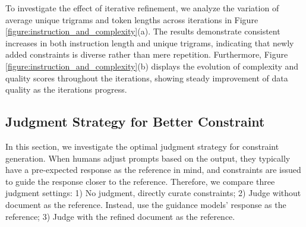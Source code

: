 To investigate the effect of iterative refinement, we analyze the variation of average unique trigrams and token lengths across iterations in Figure \ref{figure:instruction_and_complexity}(a). The results demonstrate consistent increases in both instruction length and unique trigrams, indicating that newly added constraints is diverse rather than mere repetition. Furthermore, Figure \ref{figure:instruction_and_complexity}(b) displays the evolution of complexity and quality scores throughout the iterations, showing steady improvement of data quality as the iterations progress.




\subsection{Judgment Strategy for Better Constraint}
\label{sec:judge}


In this section, we investigate the optimal judgment strategy for constraint generation. When humans adjust prompts based on the output, they typically have a pre-expected response as the reference in mind, and constraints are issued to guide the response closer to the reference. Therefore, we compare three judgment settings: 1) No judgment, directly curate constraints; 2) Judge without document as the reference. Instead, use the guidance models' response as the reference; 3) Judge with the refined document as the reference. 

